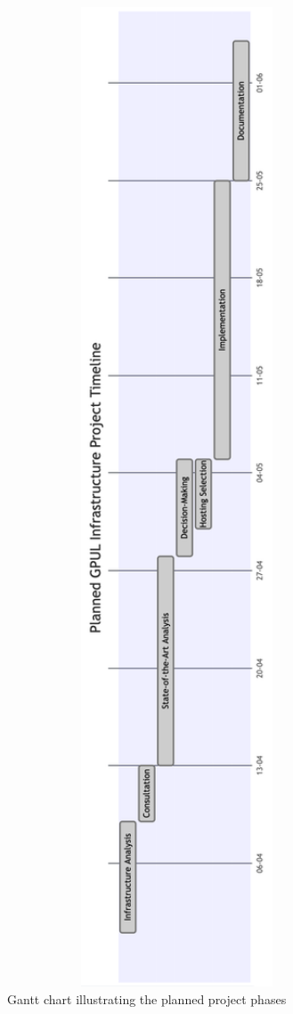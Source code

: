 \begin{figure}[H]
  \centering
  \includegraphics[width=0.9\textwidth]{imaxes/gantt-planned.png}
  \caption{Gantt chart illustrating the planned project phases}
  \label{fig:gantt-planned}
\end{figure}

